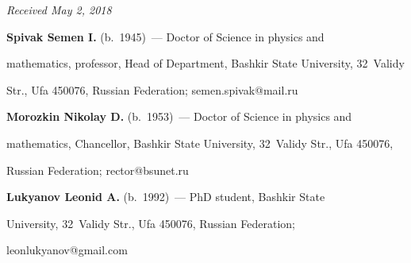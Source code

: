 \vspace*{-3pt}



\hfill{\small\textit{Received May 2, 2018}} 



\Contr



\noindent

\textbf{Spivak Semen I.} (b.\ 1945)~--- Doctor of Science in physics and 

mathematics, professor, Head of Department, Bashkir State University, 32~Validy 

Str., Ufa 450076, Russian Federation; \mbox{semen.spivak@mail.ru}



\vspace*{3pt}





\noindent

\textbf{Morozkin Nikolay D.} (b.\ 1953)~--- Doctor of Science in physics and 

mathematics, Chancellor, Bashkir State University, 32~Validy Str., Ufa 450076, 

Russian Federation; \mbox{rector@bsunet.ru}



\vspace*{3pt}



\noindent

\textbf{Lukyanov Leonid A.} (b.\ 1992)~--- PhD student, Bashkir State 

University, 32~Validy Str., Ufa 450076, Russian Federation; 

\mbox{leonlukyanov@gmail.com}

\label{end\stat}





\renewcommand{\bibname}{\protect\rm Литература}

